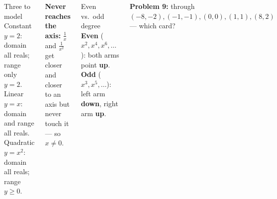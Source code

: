 \documentclass[aspectratio=169, 11pt]{beamer}
\begin{document}
\begin{frame}[t, plain]

  \begin{columns}[T]
      \begin{block}{Three to model}
        Constant \(y = 2\): domain all reals; range only \(y = 2\).\\[3pt]
        Linear \(y = x\): domain and range all reals.\\[3pt]
        Quadratic \(y = x^2\): domain all reals; range \(y \ge 0\).
      \end{block}
      \medskip
      \textbf{Never reaches the axis:} \(\frac{1}{x}\) and \(\frac{1}{x^2}\) get closer and
      closer to an axis but never touch it --- so \(x \ne 0\).
      \begin{block}{Even vs.\ odd degree}
        \textbf{Even} (\(x^2, x^4, x^6, \dots\)): both arms point \textbf{up}.\\[3pt]
        \textbf{Odd} (\(x^3, x^5, \dots\)): left arm \textbf{down}, right arm \textbf{up}.
      \end{block}
      \medskip
      \textbf{Problem 9:} through \((-8,-2), (-1,-1), (0,0), (1,1), (8,2)\) --- which card?
  \end{columns}
\end{frame}
\end{document}
